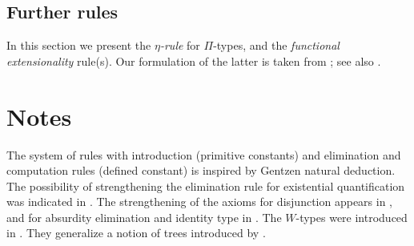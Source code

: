 \subsection{Further rules} \label{subsec:optional-rules}

In this section we present the \emph{$\eta$-rule} for $\Pi$-types, and the
\emph{functional extensionality} rule(s).  Our formulation of the latter is
taken from \cite{garner:depprod}; see also \cite{hofmann:thesis}.


\egroup

\section{Notes}\label{subsec:general-remarks}


  The system of rules with introduction (primitive constants) and elimination
  and computation rules (defined constant) is inspired by Gentzen natural
  deduction. The possibility of strengthening the elimination rule for
  existential quantification was indicated in \cite{Howard-1969}. The
  strengthening of the axioms for disjunction appears in \cite{Martin-Lof-1972},
  and for absurdity elimination and identity type in \cite{Martin-Lof-1973}. The
  $W$-types were introduced in \cite{Martin-Lof-1979}. They generalize a notion
  of trees introduced by \cite{Tait-1968}.

